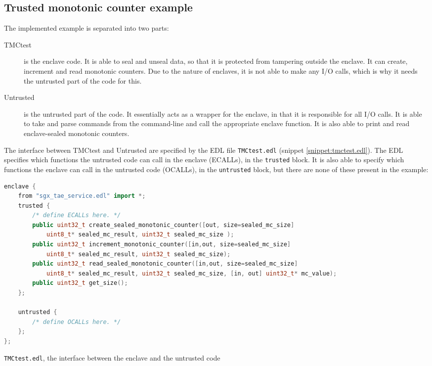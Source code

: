 \documentclass[12pt]{article}
\begin{document}
	\subsection{Trusted monotonic counter example}
	The implemented example is separated into two parts:
	\begin{description}
		\item [TMCtest] is the enclave code. It is able to seal and unseal data, so that it is protected from tampering outside the enclave. It can create, increment and read monotonic counters. Due to the nature of enclaves, it is not able to make any I/O calls, which is why it needs the untrusted part of the code for this.
		\item [Untrusted] is the untrusted part of the code. It essentially acts as a wrapper for the enclave, in that it is responsible for all I/O calls. It is able to take and parse commands from the command-line and call the appropriate enclave function. It is also able to print and read enclave-sealed monotonic counters.  
	\end{description}
	The interface between TMCtest and Untrusted are specified by the EDL file \texttt{TMCtest.edl} (snippet \ref{snippet:tmctest.edl}). The EDL specifies which functions the untrusted code can call in the enclave (ECALLs), in the \texttt{trusted} block. 
	It is also able to specify which functions the enclave can call in the untrusted code (OCALLs), in the \texttt{untrusted} block, but there are none of these present in the example:
	\begin{snippet}[!ht]
	\begin{lstlisting}[language=C++, numbers=none]
enclave {
	from "sgx_tae_service.edl" import *;
    trusted {
        /* define ECALLs here. */
        public uint32_t create_sealed_monotonic_counter([out, size=sealed_mc_size]
            uint8_t* sealed_mc_result, uint32_t sealed_mc_size );
		public uint32_t increment_monotonic_counter([in,out, size=sealed_mc_size]
            uint8_t* sealed_mc_result, uint32_t sealed_mc_size);
		public uint32_t read_sealed_monotonic_counter([in,out, size=sealed_mc_size]
            uint8_t* sealed_mc_result, uint32_t sealed_mc_size, [in, out] uint32_t* mc_value);
		public uint32_t get_size();
    };

    untrusted {
        /* define OCALLs here. */
    };
};
	\end{lstlisting}
	\caption{\texttt{TMCtest.edl}, the interface between the enclave and the untrusted code\label{snippet:tmctest.edl}}
	\end{snippet}
\end{document}
